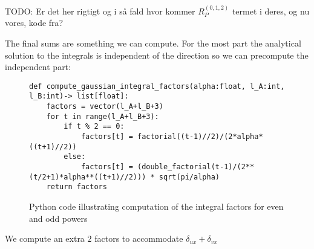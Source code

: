 TODO: Er det her rigtigt og i så fald hvor kommer $R_P^{(0,1,2)}$ termet i deres, og nu vores, kode fra?

The final sums are something we can compute. For the most part the analytical solution to the integrals is independent of the direction so we can precompute the independent part: 
\begin{figure}[H]
\begin{verbatim}
def compute_gaussian_integral_factors(alpha:float, l_A:int, l_B:int)-> list[float]:
    factors = vector(l_A+l_B+3)
    for t in range(l_A+l_B+3):
        if t % 2 == 0:
            factors[t] = factorial((t-1)//2)/(2*alpha*((t+1)//2))
        else:
            factors[t] = (double_factorial(t-1)/(2**(t/2+1)*alpha**((t+1)//2))) * sqrt(pi/alpha)
    return factors
\end{verbatim}
    \caption{Python code illustrating computation of the integral factors for even and odd powers}
\end{figure}
We compute an extra $2$ factors to accommodate $\delta_{ux}+\delta_{vx}$

